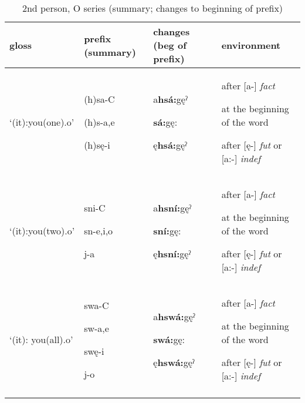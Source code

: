 \begin{table}
\caption{2nd person, O series (summary; changes to beginning of prefix)}
\label{tab:1:2ppron}
\tiny{
\begin{tabularx}{\textwidth}{XXXX}
\lsptoprule
gloss & prefix (summary) & changes (beg of prefix) & environment\\
\midrule
‘(it):you(one).o’ & (h)sa-C

(h)s-a,e

(h)sę-i & a\textbf{hsá:}gęˀ

\textbf{sá:}gę:

ę\textbf{hsá:}gęˀ & after [a-] \textit{fact}

at the beginning of the word 

after [ę-] \textit{fut} or [a:-] \textit{indef}\\
‘(it):you(two).o’ & sni-C

sn-e,i,o

j-a & a\textbf{hsní:}gęˀ

\textbf{sní:}gę:

ę\textbf{hsní:}gęˀ & after [a-] \textit{fact}

at the beginning of the word 

after [ę-] \textit{fut} or [a:-] \textit{indef}\\
‘(it): you(all).o’ & swa-C

sw-a,e

swę-i

j-o & a\textbf{hswá:}gęˀ

\textbf{swá:}gę:

ę\textbf{hswá:}gęˀ & after [a-] \textit{fact}

at the beginning of the word 

after [ę-] \textit{fut} or [a:-] \textit{indef}\\
\lspbottomrule
\end{tabularx}}
\end{table}


\lipsum[1-1]

